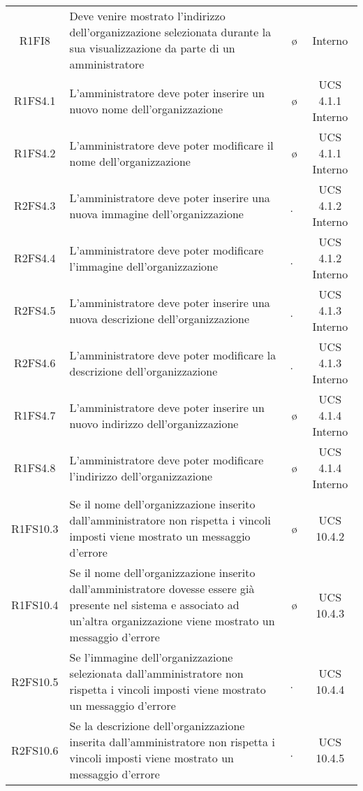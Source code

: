 {\begin{longtable}{ c C{4cm} c c}
R1FI8 & Deve venire mostrato l'indirizzo dell'organizzazione selezionata durante la sua visualizzazione da parte di un amministratore & \o & Interno\\

R1FS4.1 & L'amministratore deve poter inserire un nuovo nome dell'organizzazione & \o & UCS 4.1.1 Interno\\

R1FS4.2 & L'amministratore deve poter modificare il nome dell'organizzazione & \o & UCS 4.1.1 Interno\\

R2FS4.3 & L'amministratore deve poter inserire una nuova immagine dell'organizzazione & \d & UCS 4.1.2 Interno\\

R2FS4.4 & L'amministratore deve poter modificare l'immagine dell'organizzazione & \d & UCS 4.1.2 Interno\\

R2FS4.5 & L'amministratore deve poter inserire una nuova descrizione dell'organizzazione & \d & UCS 4.1.3 Interno\\

R2FS4.6 & L'amministratore deve poter modificare la descrizione dell'organizzazione & \d & UCS 4.1.3 Interno\\

R1FS4.7 & L'amministratore deve poter inserire un nuovo indirizzo dell'organizzazione & \o & UCS 4.1.4 Interno\\

R1FS4.8 & L'amministratore deve poter modificare l'indirizzo dell'organizzazione & \o & UCS 4.1.4 Interno\\

R1FS10.3 & Se il nome dell'organizzazione inserito dall'amministratore non rispetta i vincoli imposti viene mostrato un messaggio d'errore & \o & UCS 10.4.2\\

R1FS10.4 & Se il nome dell'organizzazione inserito dall'amministratore dovesse essere già presente nel sistema e associato ad un'altra organizzazione viene mostrato un messaggio d'errore & \o & UCS 10.4.3\\

R2FS10.5 & Se l'immagine dell'organizzazione selezionata dall'amministratore non rispetta i vincoli imposti viene mostrato un messaggio d'errore & \d & UCS 10.4.4\\

R2FS10.6 & Se la descrizione dell'organizzazione inserita dall'amministratore non rispetta i vincoli imposti viene mostrato un messaggio d'errore & \d & UCS 10.4.5\\


\end{longtable}}
